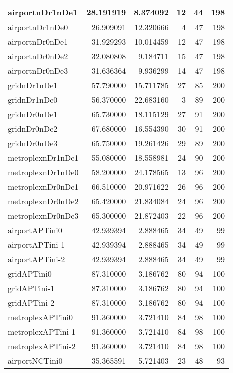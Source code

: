 \begin{longtable}{|l|r|r|r|r|r|}
\endlastfoot
airportnDr1nDe1 & 28.191919 & 8.374092 & 12 & 44 & 198 \\ \hline
airportnDr1nDe0 & 26.909091 & 12.320666 & 4 & 47 & 198 \\ \hline
airportnDr0nDe1 & 31.929293 & 10.014459 & 12 & 47 & 198 \\ \hline
airportnDr0nDe2 & 32.080808 & 9.184711 & 15 & 47 & 198 \\ \hline
airportnDr0nDe3 & 31.636364 & 9.936299 & 14 & 47 & 198 \\ \hline
gridnDr1nDe1 & 57.790000 & 15.711785 & 27 & 85 & 200 \\ \hline
gridnDr1nDe0 & 56.370000 & 22.683160 & 3 & 89 & 200 \\ \hline
gridnDr0nDe1 & 65.730000 & 18.115129 & 27 & 91 & 200 \\ \hline
gridnDr0nDe2 & 67.680000 & 16.554390 & 30 & 91 & 200 \\ \hline
gridnDr0nDe3 & 65.750000 & 19.261426 & 29 & 89 & 200 \\ \hline
metroplexnDr1nDe1 & 55.080000 & 18.558981 & 24 & 90 & 200 \\ \hline
metroplexnDr1nDe0 & 58.200000 & 24.178565 & 13 & 96 & 200 \\ \hline
metroplexnDr0nDe1 & 66.510000 & 20.971622 & 26 & 96 & 200 \\ \hline
metroplexnDr0nDe2 & 65.420000 & 21.834084 & 24 & 96 & 200 \\ \hline
metroplexnDr0nDe3 & 65.300000 & 21.872403 & 22 & 96 & 200 \\ \hline
airportAPTini0 & 42.939394 & 2.888465 & 34 & 49 & 99 \\ \hline
airportAPTini-1 & 42.939394 & 2.888465 & 34 & 49 & 99 \\ \hline
airportAPTini-2 & 42.939394 & 2.888465 & 34 & 49 & 99 \\ \hline
gridAPTini0 & 87.310000 & 3.186762 & 80 & 94 & 100 \\ \hline
gridAPTini-1 & 87.310000 & 3.186762 & 80 & 94 & 100 \\ \hline
gridAPTini-2 & 87.310000 & 3.186762 & 80 & 94 & 100 \\ \hline
metroplexAPTini0 & 91.360000 & 3.721410 & 84 & 98 & 100 \\ \hline
metroplexAPTini-1 & 91.360000 & 3.721410 & 84 & 98 & 100 \\ \hline
metroplexAPTini-2 & 91.360000 & 3.721410 & 84 & 98 & 100 \\ \hline
airportNCTini0 & 35.365591 & 5.721403 & 23 & 48 & 93 \\ \hline

\end{longtable}
